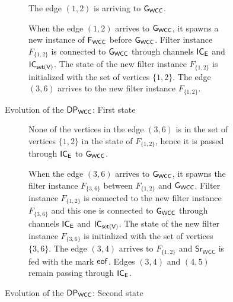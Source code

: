 \begin{figure}[h!]
\centering
\begin{subfigure}[b]{\textwidth}
 \centering
  \caption{The edge $(1,2)$ is arriving to $\mathsf{G_{WCC}}$.}
  \label{fig:dp_example_1_2a}
\end{subfigure}
\vspace{.3cm}

\begin{subfigure}[b]{\textwidth}
 \centering
  \caption{When the edge $(1,2)$ arrives to $\mathsf{G_{WCC}}$, it  spawns a new instance of $\mathsf{F_{WCC}}$ before $\mathsf{G_{WCC}}$. Filter instance $F_{\{1,2\}}$ is connected to  $\mathsf{G_{WCC}}$ through channels $\mathsf{IC_E}$ and  $\mathsf{IC_{set(V)}}$. The state of the new filter instance $F_{\{1,2\}}$ is initialized with the set of vertices $\{1,2\}$. The edge $(3,6)$ arrives to the new filter instance $F_{\{1,2\}}$.}
  \label{fig:dp_example_1_2b}
\end{subfigure}
\caption[$\dpwcc$ Evolving first state]{Evolution of the $\dpwcc$: First state}
\label{fig:dp_example_1_2}
\end{figure}
\vspace{.5cm}

\begin{figure}[h!]
\centering
\begin{subfigure}[b]{\textwidth}
 \centering
  \caption{None of the vertices in the edge $(3,6)$ is in the set of vertices $\{1,2\}$ in the state of $F_{\{1,2\}}$, hence it is passed through $\mathsf{IC_E}$ to $\mathsf{G_{WCC}}$.}
  \label{fig:dp_example_3_4a}
\end{subfigure}
\vspace{.3cm}

\begin{subfigure}[b]{\textwidth}
 \centering
  \caption{When the edge $(3,6)$ arrives to $\mathsf{G_{WCC}}$, it spawns the filter instance $F_{\{3,6\}}$  between $F_{\{1,2\}}$ and $\mathsf{G_{WCC}}$. Filter instance $F_{\{1,2\}}$ is connected to the new filter instance $F_{\{3,6\}}$ and this one is connected to  $\mathsf{G_{WCC}}$ through channels $\mathsf{IC_E}$ and  $\mathsf{IC_{set(V)}}$. The state of the new filter instance $F_{\{3,6\}}$ is initialized with the set of vertices $\{3,6\}$. The edge $(3,4)$ arrives to $F_{\{1,2\}}$  and $\mathsf{Sr_{WCC}}$ is fed with the mark $\mathsf{eof}$. Edges $(3,4)$ and $(4,5)$ remain passing through $\mathsf{IC_E}$.}
  \label{fig:dp_example_3_4b}
\end{subfigure}
\caption[$\dpwcc$ Evolving second state]{Evolution of the $\dpwcc$: Second state}
\label{fig:dp_example_3_4}
\end{figure}
\vspace{.5cm}

